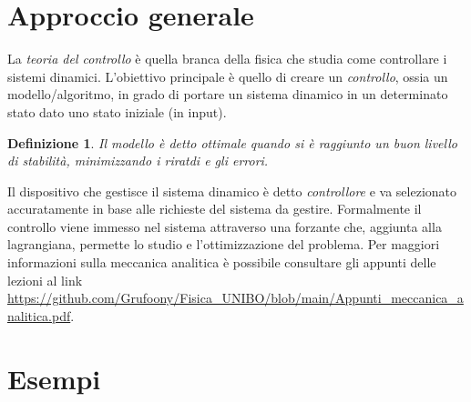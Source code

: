 \documentclass[12pt, a4paper]{book}
\theoremstyle{theorem}
\newtheorem{definition}{Definizione}[section]
\begin{document}
		\section{Approccio generale}
			La \emph{teoria del controllo} è quella branca della fisica che studia come controllare i sistemi dinamici.
			L'obiettivo principale è quello di creare un \emph{controllo}, ossia un modello/algoritmo, in grado di portare un sistema dinamico in un determinato stato dato uno stato iniziale (in input).
			\begin{definition}
				Il modello è detto ottimale quando si è raggiunto un buon livello di stabilità, minimizzando i riratdi e gli errori.
			\end{definition}
			Il dispositivo che gestisce il sistema dinamico è detto \emph{controllore} e va selezionato accuratamente in base alle richieste del sistema da gestire.
			Formalmente il controllo viene immesso nel sistema attraverso una forzante che, aggiunta alla lagrangiana, permette lo studio e l'ottimizzazione del problema.
			Per maggiori informazioni sulla meccanica analitica è possibile consultare gli appunti delle lezioni al link \url{https://github.com/Grufoony/Fisica_UNIBO/blob/main/Appunti_meccanica_analitica.pdf}.

		\section{Esempi}
\end{document}
